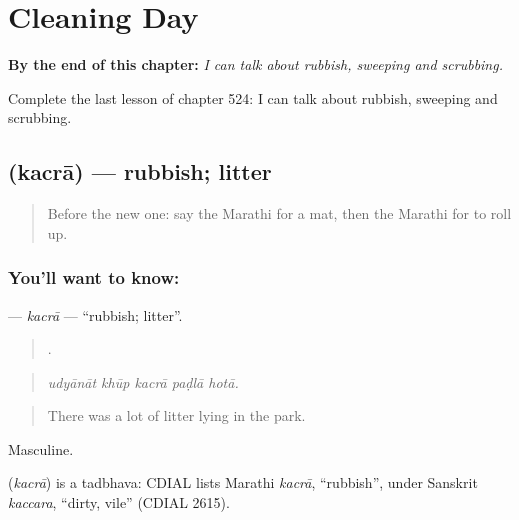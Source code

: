 
\chapter{Cleaning Day}
\label{ch:mr-cleaning-day}

\begin{chapteropening}
\textbf{By the end of this chapter:} \emph{I can talk about rubbish, sweeping and scrubbing.}

Complete the last lesson of chapter 524: I can talk about rubbish, sweeping and scrubbing.
\end{chapteropening}

\section[\texorpdfstring{\mr{कचरा} (kacrā)}{कचरा (kacrā)}]{ (kacrā) — rubbish; litter}

\label{lesson:MR-C524-kacra}



\begin{quote}
Before the new one: say the Marathi for a mat, then the Marathi for to roll up.
\end{quote}

\subsection*{You'll want to know: }
\textbf{} — \emph{kacrā} — \textquotedblleft{}rubbish; litter\textquotedblright{}.

\begin{quote}
    .
\end{quote}

\begin{quote}
\emph{udyānāt khūp kacrā paḍlā hotā.}
\end{quote}

\begin{quote}
There was a lot of litter lying in the park.
\end{quote}

Masculine.

\begin{cousinweb}
\textbf{} (\emph{kacrā}) is a tadbhava: CDIAL lists Marathi \emph{kacrā}, \textquotedblleft{}rubbish\textquotedblright{}, under Sanskrit \emph{kaccara}, \textquotedblleft{}dirty, vile\textquotedblright{} (CDIAL 2615).
\end{cousinweb}

